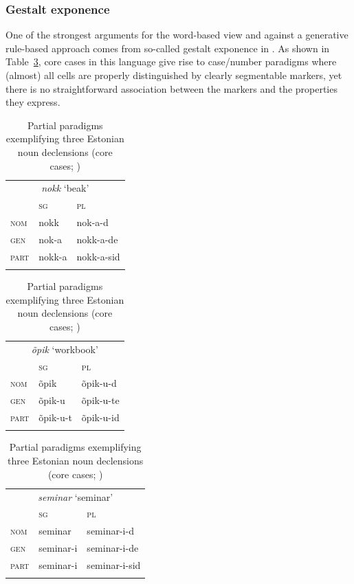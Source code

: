 \documentclass[output=paper
	        ,collection
	        ,collectionchapter
 	        ,biblatex
                ,babelshorthands
                ,newtxmath
                ,draftmode
                ,colorlinks, citecolor=brown
]{langscibook}
\begin{document}
\begin{exe}
\begin{xlist}
\begin{exe}
\begin{xlist}
\subsubsection{Gestalt exponence}

One of the strongest arguments for the word-based view and against a
generative rule-based approach comes from so-called gestalt exponence
in  \citep{Blevins05}. As shown in Table~\ref{tab:Estonian},
core cases in this language give rise to case/number paradigms where
(almost) all cells are properly distinguished by clearly segmentable
markers, yet there is no straightforward association between the
markers and the properties they express.   


\begin{table}[htbp]
  \small
  \setlength{\tabcolsep}{.7\tabcolsep}
\begin{tabular}{l|ll}
 \multicolumn{3}{c}{\textit{nokk} `beak'} \\
\lsptoprule
  & \textsc{sg} & \textsc{pl}  \\
  \midrule
  \textsc{nom} & nokk & nok-a-d \\
  \textsc{gen} & nok-a & nokk-a-de\\
  \textsc{part} & nokk-a & nokk-a-sid\\
\lspbottomrule
\end{tabular}
\hfill
\begin{tabular}{l|ll} 
\multicolumn{3}{c}{\textit{õpik} `workbook'}\\
\lsptoprule
  & \textsc{sg} & \textsc{pl}  \\
  \midrule
  \textsc{nom}  & õpik & õpik-u-d\\
  \textsc{gen}  & õpik-u & õpik-u-te\\
  \textsc{part} & õpik-u-t & õpik-u-id \\
\lspbottomrule
\end{tabular}\hfill
\begin{tabular}{l|ll} 
\multicolumn{3}{c}{\textit{seminar} `seminar'}\\
\lsptoprule
  & \textsc{sg} & \textsc{pl}\\
  \midrule
  \textsc{nom}  & seminar & seminar-i-d\\
  \textsc{gen}  & seminar-i & seminar-i-de\\
  \textsc{part} & seminar-i & seminar-i-sid \\
\lspbottomrule
\end{tabular}
\hfill
  \caption{Partial paradigms exemplifying three Estonian noun declensions (core cases; \citealp[287]{Blevins:Ackerman:Malouf:2016})}
\label{tab:Estonian}
\end{table}


\end{xlist}
\end{exe}
\end{xlist}
\end{exe}
\end{document}
